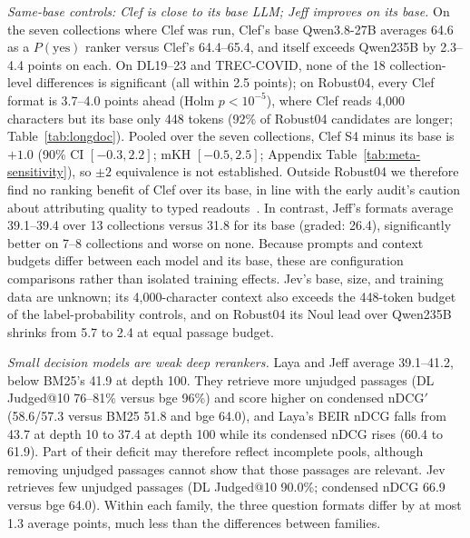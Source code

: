 \emph{Same-base controls: Clef is close to its base LLM; Jeff improves on its base.} On the seven collections where Clef was run, Clef's base Qwen3.8-27B averages 64.6 as a $P(\text{yes})$ ranker versus Clef's 64.4--65.4, and itself exceeds Qwen235B by 2.3--4.4 points on each. On DL19--23 and TREC-COVID, none of the 18 collection-level differences is significant (all within 2.5 points); on Robust04, every Clef format is 3.7--4.0 points ahead (Holm $p<10^{-5}$), where Clef reads 4{,}000 characters but its base only 448 tokens (92\% of Robust04 candidates are longer; Table~\ref{tab:longdoc}). Pooled over the seven collections, Clef S4 minus its base is $+1.0$ (90\% CI $[-0.3,2.2]$; mKH $[-0.5,2.5]$; Appendix Table~\ref{tab:meta-sensitivity}), so $\pm2$ equivalence is not established. Outside Robust04 we therefore find no ranking benefit of Clef over its base, in line with the early audit's caution about attributing quality to typed readouts~\cite{tang2026tdmaudit}. In contrast, Jeff's formats average 39.1--39.4 over 13 collections versus 31.8 for its base (graded: 26.4), significantly better on 7--8 collections and worse on none. Because prompts and context budgets differ between each model and its base, these are configuration comparisons rather than isolated training effects. Jev's base, size, and training data are unknown; its 4{,}000-character context also exceeds the 448-token budget of the label-probability controls, and on Robust04 its Noul lead over Qwen235B shrinks from 5.7 to 2.4 at equal passage budget.

\emph{Small decision models are weak deep rerankers.} Laya and Jeff average 39.1--41.2, below BM25's 41.9 at depth 100. They retrieve more unjudged passages (DL Judged@10 76--81\% versus bge 96\%) and score higher on condensed nDCG$'$ (58.6/57.3 versus BM25 51.8 and bge 64.0), and Laya's BEIR nDCG falls from 43.7 at depth 10 to 37.4 at depth 100 while its condensed nDCG rises (60.4 to 61.9). Part of their deficit may therefore reflect incomplete pools, although removing unjudged passages cannot show that those passages are relevant. Jev retrieves few unjudged passages (DL Judged@10 90.0\%; condensed nDCG 66.9 versus bge 64.0).
Within each family, the three question formats differ by at most 1.3 average points, much less than the differences between families.



